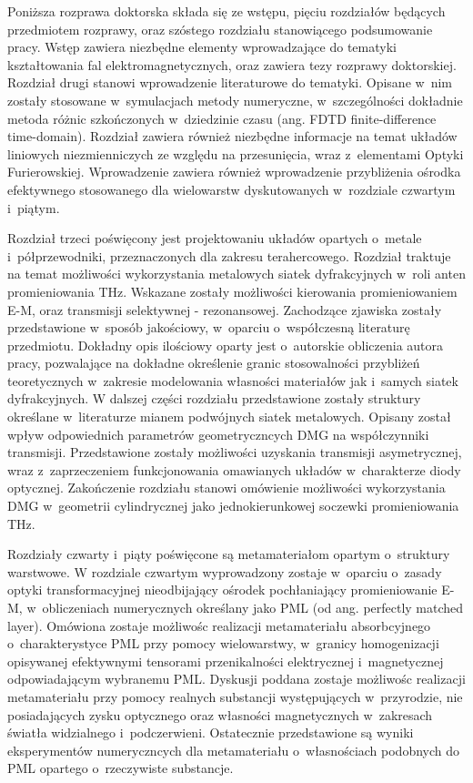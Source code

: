 Poniższa rozprawa doktorska składa się ze wstępu, pięciu rozdziałów  będących przedmiotem rozprawy, oraz szóstego rozdziału stanowiącego podsumowanie pracy. Wstęp zawiera niezbędne elementy wprowadzające do tematyki kształtowania fal elektromagnetycznych, oraz zawiera tezy rozprawy doktorskiej. Rozdział drugi stanowi wprowadzenie literaturowe do tematyki. Opisane w~nim zostały stosowane w~symulacjach metody numeryczne, w~szczególności dokładnie metoda różnic szkończonych w~dziedzinie czasu (ang. FDTD finite-difference time-domain). Rozdział zawiera również niezbędne informacje na temat układów liniowych niezmienniczych ze względu na przesunięcia, wraz z~elementami Optyki Furierowskiej. Wprowadzenie zawiera również wprowadzenie przybliżenia ośrodka efektywnego stosowanego dla wielowarstw dyskutowanych w~rozdziale czwartym i~piątym.

Rozdział trzeci poświęcony jest projektowaniu układów opartych o~metale i~półprzewodniki, przeznaczonych dla zakresu terahercowego. Rozdział traktuje na temat możliwości wykorzystania metalowych siatek dyfrakcyjnych w~roli anten promieniowania THz. Wskazane zostały możliwości kierowania promieniowaniem E-M, oraz transmisji  selektywnej - rezonansowej. Zachodzące zjawiska zostały przedstawione w~sposób jakościowy, w~oparciu o~współczesną literaturę przedmiotu. Dokładny opis ilościowy oparty jest o~autorskie obliczenia autora pracy, pozwalające na dokładne określenie granic stosowalności przybliżeń teoretycznych w~zakresie modelowania własności materiałów jak i~samych siatek dyfrakcyjnych. W dalszej części rozdziału przedstawione zostały struktury określane w~literaturze mianem podwójnych siatek metalowych. Opisany został wpływ odpowiednich parametrów geometryczncych DMG na współczynniki transmisji. Przedstawione zostały możliwości uzyskania transmisji asymetrycznej, wraz z~zaprzeczeniem funkcjonowania omawianych układów w~charakterze diody optycznej. Zakończenie rozdziału stanowi omówienie możliwości wykorzystania DMG w~geometrii cylindrycznej jako jednokierunkowej soczewki promieniowania THz.

Rozdziały czwarty i~piąty poświęcone są metamateriałom opartym o~struktury warstwowe. W rozdziale czwartym wyprowadzony zostaje w~oparciu o~zasady optyki transformacyjnej nieodbijający ośrodek pochłaniający promieniowanie E-M, w~obliczeniach numerycznych określany jako PML (od ang. perfectly matched layer). Omówiona zostaje możliwośc realizacji metamateriału absorbcyjnego o~charakterystyce PML przy pomocy wielowarstwy, w~granicy homogenizacji opisywanej efektywnymi tensorami przenikalności elektrycznej i~magnetycznej odpowiadającym wybranemu PML. Dyskusji poddana zostaje możliwośc realizacji metamateriału przy pomocy realnych substancji występujących w~przyrodzie, nie posiadających zysku optycznego oraz własności magnetycznych w~zakresach światła widzialnego i~podczerwieni. Ostatecznie przedstawione są wyniki eksperymentów numeryczncych dla metamateriału o~własnościach podobnych do PML opartego o~rzeczywiste substancje.

